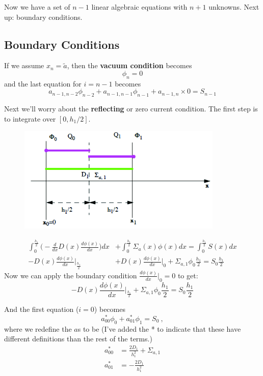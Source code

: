 \documentclass[12pt]{article}
\begin{document}
Now we have a set of $n-1$ linear algebraic equations with $n+1$ unknowns. Next up: boundary conditions.


\subsection{Boundary Conditions}

If we assume $x_n = \tilde{a}$, then the \textbf{vacuum condition} becomes
\[\phi_n = 0\]
and the last equation for $i=n-1$ becomes
\[a_{n-1,n-2} \phi_{n-2} + a_{n-1,n-1}\phi_{n-1} + a_{n-1, n} \times 0 = S_{n-1}\]

Next we'll worry about the \textbf{reflecting} or zero current condition. The first step is to integrate over $[0, h_{1}/2]$.
%
\begin{figure}[h!]
\includegraphics[height=2in]{ReflectingBC}
\end{figure}
%
\begin{align}
\int_{0}^{\frac{h_{1}}{2}} \biggl(-\frac{d}{dx}D(x)\frac{d \phi(x)}{dx}\biggr) dx &+ \int_{0}^{\frac{h_{1}}{2}} \Sigma_a(x) \phi(x) dx = \int_{0}^{\frac{h_{1}}{2}} S(x) dx \nonumber \\
%
-D(x)\frac{d \phi(x)}{dx}\big|_{\frac{h_{1}}{2}} &+ D(x)\frac{d \phi(x)}{dx}\big|_{0} + \Sigma_{a,1}\phi_0 \frac{h_1}{2} = S_0 \frac{h_1}{2} \nonumber 
\end{align}
%
Now we can apply the boundary condition $\frac{d \phi(x)}{dx}\big|_{0} = 0$ to get:
\[-D(x)\frac{d \phi(x)}{dx}\big|_{\frac{h_{1}}{2}} + \Sigma_{a,1}\phi_0 \frac{h_1}{2} = S_0 \frac{h_1}{2}\]

And the first equation ($i=0$) becomes
\[a_{00}^*\phi_0 + a_{01}^* \phi_1 = S_0\:,\]
%
where we redefine the $a$s to be (I've added the * to indicate that these have different definitions than the rest of the terms.)
%
\begin{align}
a_{00}^* &= \frac{2D_1}{h_1^2} + \Sigma_{a,1} \nonumber \\
a_{01}^* &= -\frac{2D_1}{h_1^2} \nonumber 
\end{align}
\end{document}

